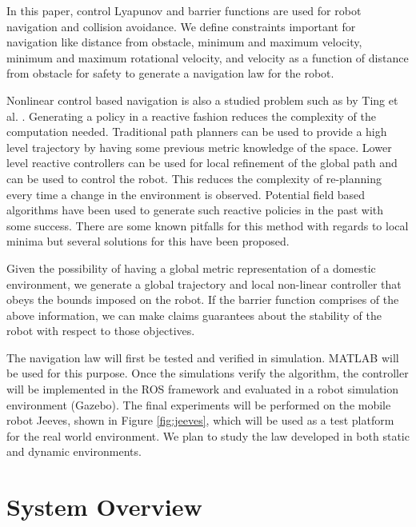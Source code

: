 \documentclass[journal]{IEEEtran}
\begin{document}
In this paper, control Lyapunov and barrier functions are used for robot navigation and collision avoidance. We define constraints important for navigation like distance from obstacle, minimum and maximum velocity, minimum and maximum rotational velocity, and velocity as a function of distance from obstacle for safety to generate a navigation law for the robot.

Nonlinear control based navigation is also a studied problem such as by Ting et al. \cite{ting2014reactive}. Generating a policy in a reactive fashion reduces the complexity of the computation needed. Traditional path planners can be used to provide a high level trajectory by having some previous metric knowledge of the space. Lower level reactive controllers can be used for local refinement of the global path and can be used to control the robot. This reduces the complexity of re-planning every time a change in the environment is observed. Potential field based algorithms have been used to generate such reactive policies in the past with some success. There are some known pitfalls for this method with regards to local minima but several solutions for this have been proposed.

Given the possibility of having a global metric representation of a domestic environment, we generate a global trajectory and local non-linear controller that obeys the bounds imposed on the robot.  If the barrier function comprises of the above information, we can make claims guarantees about the stability of the robot with respect to those objectives.

The navigation law will first be tested and verified in simulation. MATLAB will be used for this purpose. Once the simulations verify the algorithm, the controller will be implemented in the ROS framework and evaluated in a robot simulation environment (Gazebo). The final experiments will be performed on the mobile robot Jeeves, shown in Figure \ref{fig:jeeves}, which will be used as a test platform for the real world environment. We plan to study the law developed in both static and dynamic environments. 



\section{System Overview}
\end{document}
